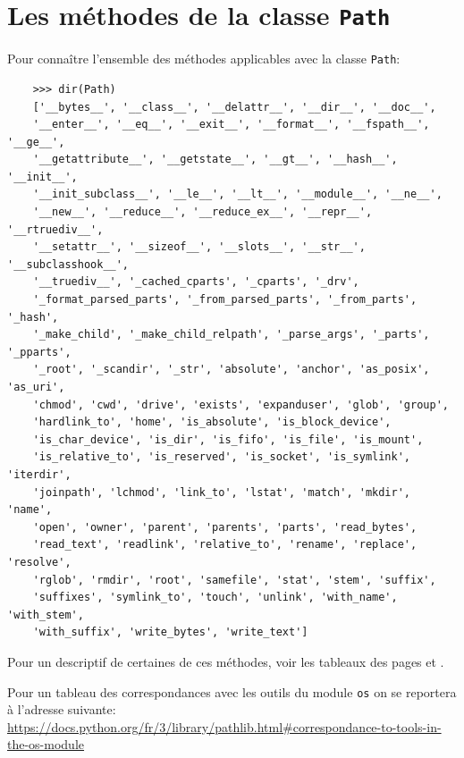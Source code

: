 \documentclass[a4paper,12pt]{book}
\begin{document}
\section{Les méthodes de la classe \texttt{Path}}
Pour connaître l'ensemble des méthodes applicables avec la classe \texttt{Path}:
\begin{verbatim}
    >>> dir(Path)
    ['__bytes__', '__class__', '__delattr__', '__dir__', '__doc__', 
    '__enter__', '__eq__', '__exit__', '__format__', '__fspath__', '__ge__', 
    '__getattribute__', '__getstate__', '__gt__', '__hash__', '__init__', 
    '__init_subclass__', '__le__', '__lt__', '__module__', '__ne__', 
    '__new__', '__reduce__', '__reduce_ex__', '__repr__', '__rtruediv__', 
    '__setattr__', '__sizeof__', '__slots__', '__str__', '__subclasshook__', 
    '__truediv__', '_cached_cparts', '_cparts', '_drv', 
    '_format_parsed_parts', '_from_parsed_parts', '_from_parts', '_hash', 
    '_make_child', '_make_child_relpath', '_parse_args', '_parts', '_pparts', 
    '_root', '_scandir', '_str', 'absolute', 'anchor', 'as_posix', 'as_uri', 
    'chmod', 'cwd', 'drive', 'exists', 'expanduser', 'glob', 'group', 
    'hardlink_to', 'home', 'is_absolute', 'is_block_device', 
    'is_char_device', 'is_dir', 'is_fifo', 'is_file', 'is_mount', 
    'is_relative_to', 'is_reserved', 'is_socket', 'is_symlink', 'iterdir', 
    'joinpath', 'lchmod', 'link_to', 'lstat', 'match', 'mkdir', 'name', 
    'open', 'owner', 'parent', 'parents', 'parts', 'read_bytes', 
    'read_text', 'readlink', 'relative_to', 'rename', 'replace', 'resolve', 
    'rglob', 'rmdir', 'root', 'samefile', 'stat', 'stem', 'suffix', 
    'suffixes', 'symlink_to', 'touch', 'unlink', 'with_name', 'with_stem', 
    'with_suffix', 'write_bytes', 'write_text']
\end{verbatim}
\medskip

Pour un descriptif de certaines de ces méthodes, voir les tableaux des pages \pageref{pathlib_1} et \pageref{pathlib_2}. \medskip

Pour un tableau des correspondances avec les outils du module \texttt{os} on se reportera à l'adresse suivante: \\ \url{https://docs.python.org/fr/3/library/pathlib.html\#correspondance-to-tools-in-} \\
\url{the-os-module}
\medskip
\end{document}
